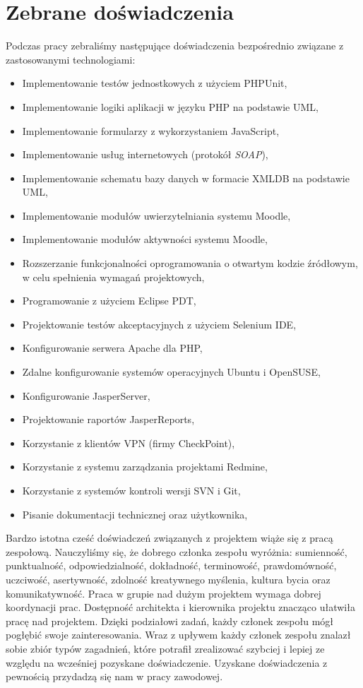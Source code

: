 \chapter{Zebrane doświadczenia}
\label{Chapter8}

Podczas pracy zebraliśmy następujące doświadczenia bezpośrednio związane z zastosowanymi technologiami:
\begin{itemize}
\item{Implementowanie testów jednostkowych z użyciem PHPUnit,}
\item{Implementowanie logiki aplikacji w języku PHP na podstawie UML,}
\item{Implementowanie formularzy z wykorzystaniem JavaScript,}
\item{Implementowanie usług internetowych (protokół \emph{SOAP}),}
\item{Implementowanie schematu bazy danych w formacie XMLDB na podstawie UML,}
\item{Implementowanie modułów uwierzytelniania systemu Moodle,}
\item{Implementowanie modułów aktywności systemu Moodle,}
\item{Rozszerzanie funkcjonalności oprogramowania o otwartym kodzie źródłowym, w celu spełnienia wymagań projektowych,}
\item{Programowanie z użyciem Eclipse PDT,}
\item{Projektowanie testów akceptacyjnych z użyciem Selenium IDE,}
\item{Konfigurowanie serwera Apache dla PHP,}
\item{Zdalne konfigurowanie systemów operacyjnych Ubuntu i OpenSUSE,}
\item{Konfigurowanie JasperServer,}
\item{Projektowanie raportów JasperReports,}
\item{Korzystanie z klientów VPN (firmy CheckPoint),}
\item{Korzystanie z systemu zarządzania projektami Redmine,}
\item{Korzystanie z systemów kontroli wersji SVN i Git,}
\item{Pisanie dokumentacji technicznej oraz użytkownika,}
\end{itemize}

Bardzo istotna cześć doświadczeń związanych z projektem wiąże się z pracą zespołową.
Nauczyliśmy się, że dobrego członka zespołu wyróżnia: sumienność, punktualność, odpowiedzialność, dokładność, terminowość, prawdomówność, uczciwość, asertywność, zdolność kreatywnego myślenia, kultura bycia oraz komunikatywność. Praca w grupie nad dużym projektem wymaga dobrej koordynacji prac. Dostępność architekta i kierownika projektu znacząco ułatwiła pracę nad projektem. Dzięki podziałowi zadań, każdy członek zespołu mógł pogłębić swoje zainteresowania. Wraz z upływem każdy członek zespołu znalazł sobie zbiór typów zagadnień, które potrafił zrealizować szybciej i lepiej ze względu na wcześniej pozyskane doświadczenie. Uzyskane doświadczenia z pewnością przydadzą się nam w pracy zawodowej.

